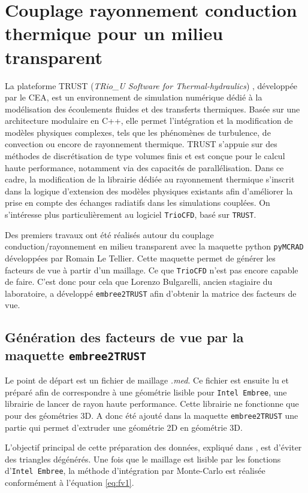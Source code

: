 
\newpage
\section{Couplage rayonnement conduction thermique pour un milieu transparent}
La plateforme TRUST (\textit{TRio\_U Software for Thermal-hydraulics})  \cite{saikali2025trust}, développée par le CEA, est un environnement de simulation numérique dédié à la modélisation des écoulements fluides et des transferts thermiques. Basée sur une architecture modulaire en C++, elle permet l’intégration et la modification de modèles physiques complexes, tels que les phénomènes de turbulence, de convection ou encore de rayonnement thermique. TRUST s’appuie sur des méthodes de discrétisation de type volumes finis et est conçue pour le calcul haute performance, notamment via des capacités de parallélisation. Dans ce cadre, la modification de la librairie dédiée au rayonnement thermique s’inscrit dans la logique d’extension des modèles physiques existants afin d’améliorer la prise en compte des échanges radiatifs dans les simulations couplées. On s'intéresse plus particulièrement au logiciel \texttt{TrioCFD}, basé sur \texttt{TRUST}.

Des premiers travaux ont été réalisés autour du couplage conduction/rayonnement en milieu transparent avec la maquette python \texttt{pyMCRAD} développées par Romain Le Tellier. Cette maquette permet de générer les facteurs de vue à partir d'un maillage. Ce que \texttt{TrioCFD} n'est pas encore capable de faire. C'est donc pour cela que Lorenzo Bulgarelli, ancien stagiaire du laboratoire, a développé \texttt{embree2TRUST} \cite{lorenzo} afin d'obtenir la matrice des facteurs de vue.


\subsection{Génération des facteurs de vue par la maquette  \texttt{embree2TRUST}}
Le point de départ est un fichier de maillage \textit{.med}. Ce fichier est ensuite lu et préparé afin de correspondre à une géométrie lisible pour \texttt{Intel Embree}, une librairie de lancer de rayon haute performance. Cette librairie ne fonctionne que pour des géométries 3D. A donc été ajouté dans la maquette \texttt{embree2TRUST} une partie qui permet d'extruder une géométrie 2D en géométrie 3D. 

L'objectif principal de cette préparation des données, expliqué dans \cite{lorenzo}, est d'éviter des triangles dégénérés. Une fois que le maillage est lisible par les fonctions d'\texttt{Intel Embree}, la méthode d'intégration par Monte-Carlo est réalisée conformément à l'équation \ref{eq:fv1}.


